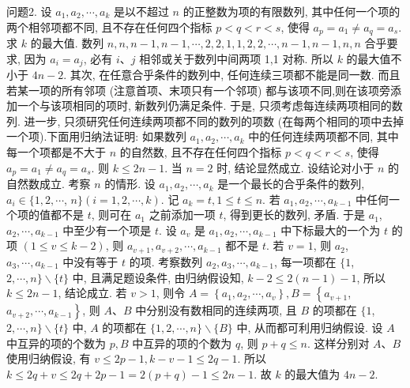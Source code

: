 问题2. 设 $a_1, a_2, \cdots, a_k$ 是以不超过 $n$ 的正整数为项的有限数列, 其中任何一个项的两个相邻项都不同, 且不存在任何四个指标 $p<q<r<s$, 使得 $a_p= a_1 \neq a_q=a_s$. 求 $k$ 的最大值.
数列 $n, n, n-1, n-1, \cdots, 2,2,1,1,2,2, \cdots, n-1, n-1, n, n$ 合乎要求, 因为 $a_i=a_j$, 必有 $i 、 j$ 相邻或关于数列中间两项 1,1 对称.
所以 $k$ 的最大值不小于 $4 n-2$. 其次, 在任意合乎条件的数列中, 任何连续三项都不能是同一数.
而且若某一项的所有邻项 (注意首项、末项只有一个邻项) 都与该项不同,则在该项旁添加一个与该项相同的项时, 新数列仍满足条件.
于是, 只须考虑每连续两项相同的数列.
进一步, 只须研究任何连续两项都不同的数列的项数 (在每两个相同的项中去掉一个项).下面用归纳法证明: 如果数列 $a_1, a_2, \cdots, a_k$ 中的任何连续两项都不同, 其中每一个项都是不大于 $n$ 的自然数, 且不存在任何四个指标 $p<q<r<s$, 使得 $a_p=a_1 \neq a_q=a_s$. 则 $k \leqslant 2 n-1$. 当 $n=2$ 时, 结论显然成立.
设结论对小于 $n$ 的自然数成立.
考察 $n$ 的情形.
设 $a_1, a_2, \cdots, a_k$ 是一个最长的合乎条件的数列, $a_i \in\{1,2, \cdots$, $n\}(i=1,2, \cdots, k)$. 记 $a_k=t, 1 \leqslant t \leqslant n$. 若 $a_1, a_2, \cdots, a_{k-1}$ 中任何一个项的值都不是 $t$, 则可在 $a_1$ 之前添加一项 $t$, 得到更长的数列, 矛盾.
于是 $a_1$, $a_2, \cdots, a_{k-1}$ 中至少有一个项是 $t$. 设 $a_v$ 是 $a_1, a_2, \cdots, a_{k-1}$ 中下标最大的一个为 $t$ 的项 $(1 \leqslant v \leqslant k-2)$, 则 $a_{v+1}, a_{v+2}, \cdots, a_{k-1}$ 都不是 $t$. 若 $v=1$, 则 $a_2$, $a_3, \cdots, a_{k-1}$ 中没有等于 $t$ 的项.
考察数列 $a_2, a_3, \cdots, a_{k-1}$, 每一项都在 $\{1$, $2, \cdots, n\} \backslash\{t\}$ 中, 且满足题设条件, 由归纳假设知, $k-2 \leqslant 2(n-1)-1$, 所以 $k \leqslant 2 n-1$, 结论成立.
若 $v>1$, 则令 $A=\left\{a_1, a_2, \cdots, a_v\right\}, B=\left\{a_{v+1}\right.$, $\left.a_{v+2}, \cdots, a_{k-1}\right\}$, 则 $A 、 B$ 中分别没有数相同的连续两项, 且 $B$ 的项都在 $\{1$, $2, \cdots, n\} \backslash\{t\}$ 中, $A$ 的项都在 $\{1,2, \cdots, n\} \backslash\{B\}$ 中, 从而都可利用归纳假设.
设 $A$ 中互异的项的个数为 $p, B$ 中互异的项的个数为 $q$, 则 $p+q \leqslant n$. 这样分别对 $A 、 B$ 使用归纳假设, 有 $v \leqslant 2 p-1, k-v-1 \leqslant 2 q-1$. 所以 $k \leqslant 2 q+ v \leqslant 2 q+2 p-1=2(p+q)-1 \leqslant 2 n-1$. 故 $k$ 的最大值为 $4 n-2$.




